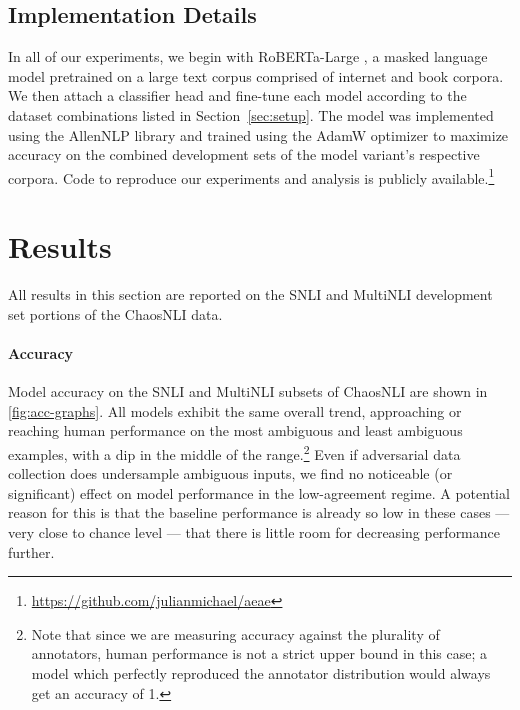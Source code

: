 \documentclass[10pt,a4paper]{article}
\begin{document}
\subsection*{Implementation Details}

In all of our experiments, we begin with RoBERTa-Large \cite{liu2019roberta}, a masked language model pretrained on a large text corpus comprised of internet and book corpora. We then attach a classifier head and fine-tune each model according to the dataset combinations listed in Section~\ref{sec:setup}.
The model was implemented using the AllenNLP library and trained using the AdamW optimizer to maximize accuracy on the combined development sets of the model variant's respective corpora. Code to reproduce our experiments and analysis is publicly available.\footnote{\url{https://github.com/julianmichael/aeae}}

\section*{Results}

All results in this section are reported on the SNLI and MultiNLI development set portions of the ChaosNLI data.

\paragraph{Accuracy}
Model accuracy on the SNLI and MultiNLI subsets of ChaosNLI are shown in \autoref{fig:acc-graphs}.
All models exhibit the same overall trend, approaching or reaching human performance on the most ambiguous and least ambiguous examples, with a dip in the middle of the range.\footnote{Note that since we are measuring accuracy against the plurality of annotators, human performance is not a strict upper bound in this case; a model which perfectly reproduced the annotator distribution would always get an accuracy of 1.}
Even if adversarial data collection does undersample ambiguous inputs, we find no noticeable (or significant) effect on model performance in the low-agreement regime.
A potential reason for this is that the baseline performance is already so low in these cases --- very close to chance level --- that there is little room for decreasing performance further.
\end{document}
